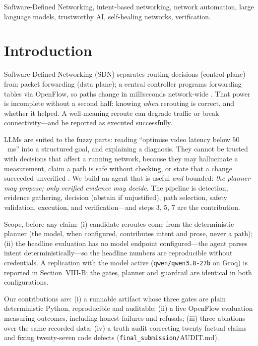 \documentclass[conference]{IEEEtran}
\newcommand{\Repo}{\texttt{final\_submission/}}
\begin{document}
\begin{IEEEkeywords}
Software-Defined Networking, intent-based networking, network automation,
large language models, trustworthy AI, self-healing networks, verification.
\end{IEEEkeywords}

\section{Introduction}
Software-Defined Networking (SDN) separates routing decisions (control
plane) from packet forwarding (data plane); a central controller programs
forwarding tables via OpenFlow, so paths change in milliseconds network-wide
\cite{mckeown2008openflow, feamster2014road, kreutz2015sdn}. That power is
incomplete without a second half: knowing \emph{when} rerouting is correct,
and whether it helped. A well-meaning reroute can degrade traffic or break
connectivity---and be reported as executed successfully.

LLMs are suited to the fuzzy parts: reading ``optimise video latency below
$50$~ms'' into a structured goal, and explaining a diagnosis. They cannot be
trusted with decisions that affect a running network, because they may
hallucinate a measurement, claim a path is safe without checking, or state
that a change succeeded unverified \cite{amodei2016safety}. We build an agent
that is useful \emph{and} bounded: \emph{the planner may propose; only
verified evidence may decide}. The pipeline is detection, evidence gathering,
decision (abstain if unjustified), path selection, safety validation,
execution, and verification---and steps 3, 5, 7 are the contribution.

Scope, before any claim: (i) candidate reroutes come from the deterministic
planner (the model, when configured, contributes intent and prose, never a
path); (ii) the headline evaluation has no model endpoint configured---the
agent parses intent deterministically---so the headline numbers are
reproducible without credentials. A replication with the model active
(\texttt{qwen/qwen3.8-27b} on Groq) is reported in Section~VIII-B; the
gates, planner and guardrail are identical in both configurations.

Our contributions are: (i) a runnable artifact whose three gates are plain
deterministic Python, reproducible and auditable; (ii) a live OpenFlow
evaluation measuring outcomes, including honest failures and refusals;
(iii) three ablations over the same recorded data; (iv) a truth audit
correcting twenty factual claims and fixing twenty-seven code defects
(\Repo AUDIT.md).
\end{document}
